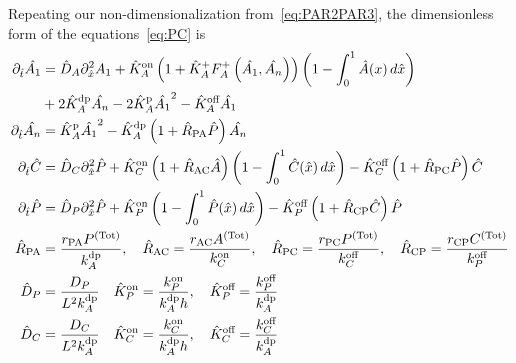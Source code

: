 \documentclass[11pt]{article}
\newcommand{\6}[1]{#1_{\text{6}}}
\newcommand{\3}[1]{#1_{\text{3}}}
\newcommand{\Tot}[1]{#1^\text{(Tot)}}
\newcommand{\A}[1]{#1_A}
\begin{document}
Repeating our non-dimensionalization from\ \eqref{eq:PAR2PAR3}, the dimensionless form of the equations\ \eqref{eq:PC} is
\begin{subequations}
\label{eq:PCND}
\begin{align}
\nonumber
\Dthat \hat{\MA} & = \DhatA \Dxhat^2 \MA +\KhatonA \left(1+\KhatfA \A{F}^+\left(\hat{\MA},\hat{\PA}\right)\right)\left(1 - \int_0^1 \hat{A}(x) \, d\hat{x} \right) \\ 
&+ 2\KhatdpA \hat{\PA}-2\KhatpA \hat{\MA}^2 - \KhatoffA \hat{\MA} \\ 
\Dthat \hat{\PA} & =\KhatpA \hat{\MA}^2- \KhatdpA \left(1+\hat{R}_\text{PA}\hat{P}\right) \hat{\PA} \\ 
\label{eq:26c}
\Dthat \hat{C} & =\DhatC \Dxhat^2 \hat{P} +\KhatonC \left(1+\hat R_\text{AC}\hat{A} \right)\left(1 - \int_0^1 \hat{C}(\hat x) \, d\hat{x} \right)  - \KhatoffC \left(1+\hat{R}_\text{PC}\hat P\right)\hat{C} \\ 
\Dthat \hat{P} & =\DhatP \Dxhat^2 \hat{P} +\KhatonP \left(1 - \int_0^1 \hat{P}(\hat x) \, d\hat{x} \right)  - \KhatoffP \left(1+\hat{R}_\text{CP}\hat C\right) \hat{P} \\ 
\hat{R}_\text{PA}&=\frac{r_\text{PA} \Tot{P}}{\kdp_A}, \quad \hat{R}_\text{AC}=\frac{r_\text{AC} \Tot{A}}{\kon_C}, \quad \hat{R}_\text{PC}=\frac{r_\text{PC} \Tot{P}}{\koff_C},\quad \hat{R}_\text{CP}=\frac{r_\text{CP} \Tot{C}}{\koff_P}\\
\DhatP &=\frac{D_P}{L^2 \A{\kdp}} \quad \KhatonP=\frac{{\kon_P}}{\A{\kdp} h },\quad \KhatoffP = \frac{\koff_P}{\kdp_A}\\
\DhatC &=\frac{D_C}{L^2 \A{\kdp}} \quad \KhatonC=\frac{{\kon_C}}{\A{\kdp} h },\quad \KhatoffC = \frac{\koff_C}{\kdp_A}
\end{align}
\end{subequations}
\end{document}
